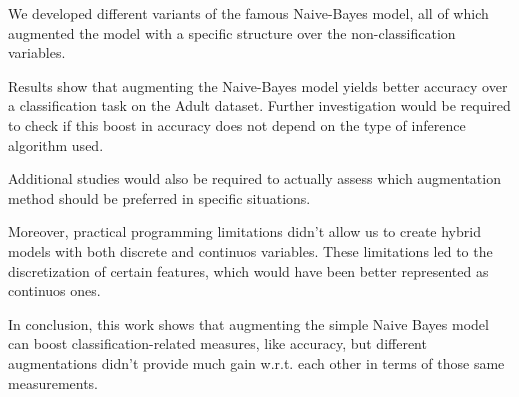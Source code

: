 \documentclass[twoside,twocolumn]{article}
\begin{document}
We developed different variants of the famous Naive-Bayes model, all of which augmented the model with a specific structure over the non-classification variables.

Results show that augmenting the Naive-Bayes model yields better accuracy over a classification task on the Adult dataset. 
Further investigation would be required to check if this boost in accuracy does not depend on the type of inference algorithm used.

Additional studies would also be required to actually assess which augmentation method should be preferred in specific situations. 

Moreover, practical programming limitations didn't allow us to create hybrid models with both discrete and continuos variables. 
These limitations led to the discretization of certain features, which would have been better represented as continuos ones.

In conclusion, this work shows that augmenting the simple Naive Bayes model can boost classification-related measures, like accuracy, 
but different augmentations didn't provide much gain w.r.t. each other in terms of those same measurements. 

\end{document}
